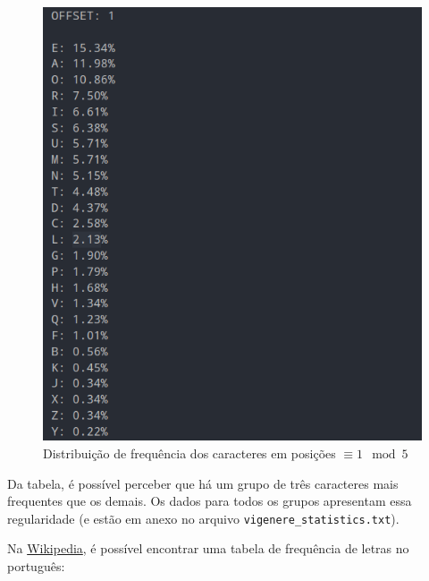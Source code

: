 \documentclass{article}
\begin{document}
    \newpage
    \FloatBarrier
    \begin{figure}[!ht]
        \begin{center}
            \includegraphics[width=\textwidth]{images/q4_1.png}
            \caption{Distribuição de frequência dos caracteres em posições $\equiv 1 \mod{5}$}
        \end{center}
    \end{figure} 

    Da tabela, é possível perceber que há um grupo de três caracteres mais frequentes que os demais. Os dados para todos os grupos apresentam essa regularidade (e estão em anexo no arquivo \texttt{vigenere\_statistics.txt}).

    Na \href{https://pt.wikipedia.org/wiki/Frequ%C3%AAncia_de_letras}{Wikipedia}, é possível encontrar uma tabela de frequência de letras no português:
\end{document}
